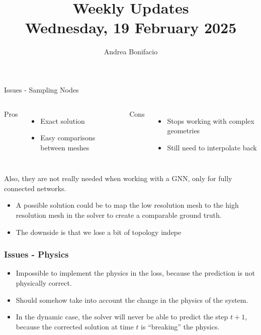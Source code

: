 \documentclass{beamer}
\title{Weekly Updates\\
\tiny{Wednesday, 19 February 2025}}
\author{Andrea Bonifacio}
\date{}
\begin{document}
\begin{frame}
\titlepage
\end{frame}


\begin{frame}{Issues - Sampling Nodes}
    \begin{columns}
        \centering Pros
        \begin{itemize}
            \item Exact solution
            \item Easy comparisons between meshes
        \end{itemize}
        \centering Cons
        \begin{itemize}
            \item Stops working with complex geometries
            \item Still need to interpolate back
        \end{itemize}
    \end{columns}

    \vspace{1cm}

    Also, they are not really needed when working with a GNN, only for fully connected networks.
    \begin{itemize}
        \item A possible solution could be to map the low resolution mesh to the high resolution mesh in the solver to create a comparable ground truth.
        \item The downside is that we lose a bit of topology indepe
    \end{itemize}  

\end{frame}



\begin{frame}
\frametitle{Issues - Physics}
\begin{itemize}
    \item Impossible to implement the physics in the loss, because the prediction is not physically correct.
    \item Should somehow take into account the change in the physics of the system.
    \item In the dynamic case, the solver will never be able to predict the step \(t+1\), because the corrected solution at time \(t\) is ``breaking'' the physics.
\end{itemize}
\end{frame}
\end{document}
